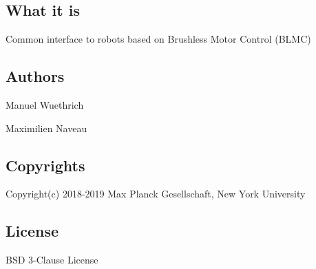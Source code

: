 \subsection*{What it is}

Common interface to robots based on Brushless Motor Control (B\+L\+MC)

\subsection*{Authors}


\begin{DoxyItemize}
\item Manuel Wuethrich
\item Maximilien Naveau
\end{DoxyItemize}

\subsection*{Copyrights}

Copyright(c) 2018-\/2019 Max Planck Gesellschaft, New York University

\subsection*{License}

B\+SD 3-\/\+Clause License 
